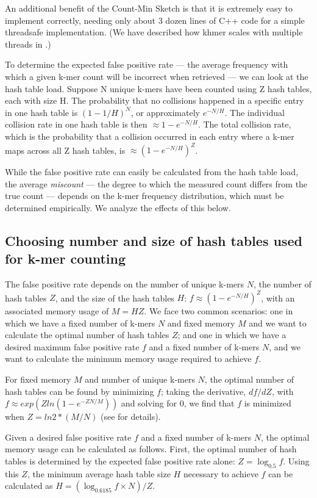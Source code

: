 \documentclass[10pt]{article}
\begin{document}
An additional benefit of the Count-Min Sketch is that it is extremely
easy to implement correctly, needing only about 3 dozen lines of C++
code for a simple threadsafe implementation.  (We have
described how khmer scales with multiple threads in
\cite{McDonald2013}.)

To determine the expected false positive rate --- the average frequency with
which a given k-mer count will be incorrect when retrieved --- we can
look at the hash table load. Suppose N unique k-mers have been counted
using Z hash tables, each with size H.  The probability that no
collisions happened in a specific entry in one hash table is
$(1-1/H)^{N}$, or approximately $e^{-N/H}$. The individual collision
rate in one hash table is then $\approx 1-e^{-N/H}$. The total
collision rate, which is the probability that a collision occurred in
each entry where a k-mer maps across all Z hash tables, is $\approx
(1-e^{-N/H})^{Z}$.

While the false positive rate can easily be calculated from the hash table
load, the average {\em miscount} --- the degree to which the measured
count differs from the true count --- depends on the k-mer frequency
distribution, which must be determined empirically.  We analyze the
effects of this below.


\subsection*{Choosing number and size of hash tables used for k-mer counting}

The false positive rate depends on the number of unique k-mers $N$,
the number of hash tables $Z$, and the size of the hash tables $H$: $f
\approx (1-e^{-N/H})^{Z}$, with an associated memory usage of $M = H
Z$.  We face two common scenarios: one in which we have a fixed number
of k-mers $N$ and fixed memory $M$ and we want to calculate the
optimal number of hash tables $Z$; and one in which we have a desired
maximum false positive rate $f$ and a fixed number of k-mers $N$, and
we want to calculate the minimum memory usage required to achieve $f$.

For fixed memory $M$ and number of unique k-mers $N$, the optimal
number of hash tables can be found by minimizing $f$; taking the
derivative, $df/dZ$, with $f \approx exp(Zln(1-e^{-ZN/M}))$ and solving
for 0, we find that $f$ is minimized when $Z=ln2*(M/N)$ (see
\cite{broder2004network} for details).

Given a desired false positive rate $f$ and a fixed number of k-mers
$N$, the optimal memory usage can be calculated as follows.  First,
the optimal number of hash tables is determined by the expected false
positive rate alone: $Z = \log_{0.5}f$.  Using this $Z$, the minimum
average hash table size $H$ necessary to achieve $f$ can be calculated
as $H = (\log_{0.6185}f\times N)/Z$.
\end{document}
